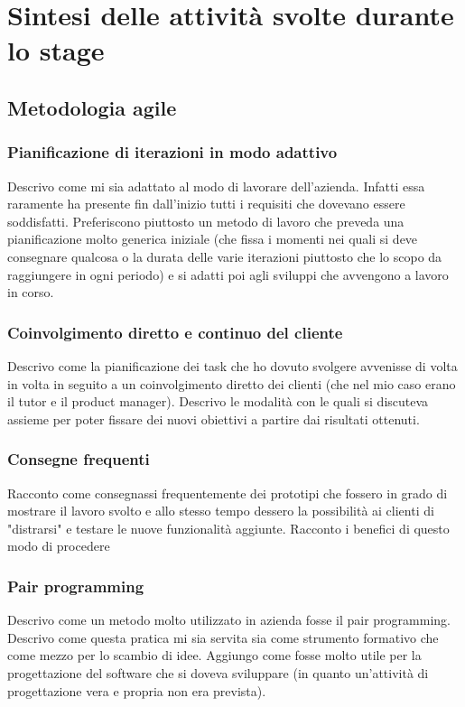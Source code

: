 \chapter{Sintesi delle attività svolte durante lo stage}
	\section{Metodologia agile}
		\subsection{Pianificazione di iterazioni in modo adattivo}
			Descrivo come mi sia adattato al modo di lavorare dell'azienda. Infatti essa raramente ha presente fin dall'inizio
			tutti i requisiti che dovevano essere soddisfatti. Preferiscono piuttosto un metodo di lavoro che preveda una
			pianificazione molto generica iniziale (che fissa i momenti nei quali si deve consegnare qualcosa o la durata delle
			varie iterazioni piuttosto che lo scopo da raggiungere in ogni periodo) e si adatti poi agli sviluppi che avvengono
			a lavoro in corso.
		\subsection{Coinvolgimento diretto e continuo del cliente}
			Descrivo come la pianificazione dei task che ho dovuto svolgere avvenisse di volta in volta in seguito a un
			coinvolgimento diretto dei clienti (che nel mio  caso erano il tutor e il product manager). Descrivo le modalità con
			le quali si discuteva assieme per poter fissare dei nuovi obiettivi a partire dai risultati ottenuti.
		\subsection{Consegne frequenti}
			Racconto come consegnassi frequentemente dei prototipi che fossero in grado di mostrare il lavoro svolto e allo
			stesso tempo dessero la possibilità ai clienti di "distrarsi" e testare le nuove funzionalità aggiunte. Racconto i
			benefici di questo modo di procedere
		\subsection{Pair programming}
			Descrivo come un metodo molto utilizzato in azienda fosse il pair programming. Descrivo come questa pratica mi sia servita
			sia come strumento formativo che come mezzo per lo scambio di idee. Aggiungo come fosse molto utile per la progettazione
			del software che si doveva sviluppare (in quanto un'attività di progettazione vera e propria non era prevista).
